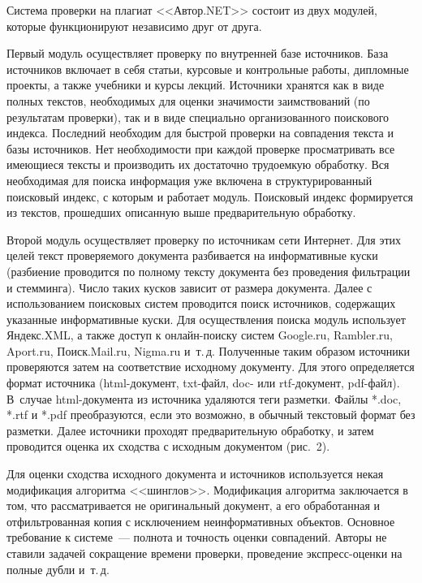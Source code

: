 \begin{multicols}{2}
  Система проверки на плагиат <<Автор.NET>> состоит из двух модулей, 
которые функционируют независимо друг от друга.
  
  Первый модуль осуществляет проверку по внут\-рен\-ней базе источников. База 
источников включает в себя статьи, курсовые и контрольные работы, 
дипломные проекты, а также учебники и курсы лекций. Источники хранятся 
как в виде полных текстов, необходимых для оценки значимости 
заимствований (по результатам проверки), так и в виде специально 
организованного поискового индекса. Последний необходим для быстрой 
проверки на совпадения текста и базы источников. Нет необходимости при 
каждой проверке просматривать все имеющиеся тексты и производить их 
достаточно трудоемкую обработку. Вся необходимая для поиска информация 
уже включена в структурированный поисковый индекс, с которым и работает 
модуль. Поисковый индекс формируется из текстов, прошедших описанную 
выше предварительную обработку.
  
  Второй модуль осуществляет проверку по источникам сети Интернет. Для 
этих целей текст проверяемого документа разбивается на информативные куски 
(разбиение проводится по полному тексту документа без проведения 
фильтрации и стемминга). Число таких кусков зависит от размера документа. 
Далее с использованием поисковых сис\-тем проводится поиск источников, 
содержащих указанные информативные куски. Для осуществления поиска 
модуль использует Яндекс.XML, а также доступ к он\-лайн-поиску 
  сис\-тем {Google.ru}, {Rambler.ru}, {Aport.ru}, 
Поиск.Mail.ru, Nigma.ru и~т.\,д. Полученные таким образом 
источники проверяются затем на соответствие исходному документу. Для этого 
определяется формат источника (html-до\-ку\-мент, txt-файл, 
doc- или 
  rtf-до\-ку\-мент, pdf-файл). В~случае html-до\-ку\-мен\-та из 
источника удаляются теги разметки. Файлы *.doc, *.rtf и 
*.pdf преобразуются, если это возможно, в обычный текстовый формат 
без разметки. Далее источники проходят предварительную обработку, и затем 
проводится оценка их сходства с исходным документом (рис.~2). 

  
Для оценки сходства исходного документа и источ\-ни\-ков используется некая 
модификация ал\-горит\-ма <<шинглов>>. Модификация алгоритма заклю\-ча\-ет\-ся в 
том, что рассматривается не ори\-ги\-наль\-ный документ, а его обработанная и 
отфильтро\-ван\-ная копия с исключением неинформативных объектов. Основное 
требование к сис\-те\-ме~--- полнота и точность оценки совпадений. Авторы не 
ставили задачей сокращение времени проверки, проведение экс\-пресс-оцен\-ки 
на полные дубли и~т.\,д. 
{

}
\end{multicols}
